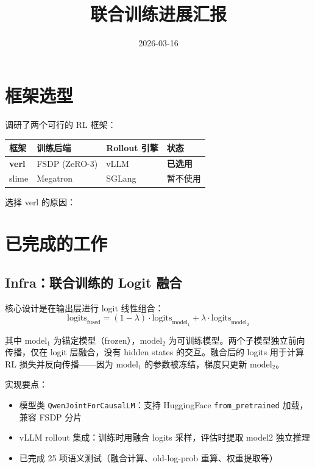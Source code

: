 \documentclass[11pt,a4paper]{article}
\title{联合训练进展汇报}
\author{}
\date{2026-03-16}
\begin{document}
\maketitle

\section{框架选型}

调研了两个可行的 RL 框架：

\begin{table}[h]
\centering
\begin{tabular}{llll}
\toprule
\textbf{框架} & \textbf{训练后端} & \textbf{Rollout 引擎} & \textbf{状态} \\
\midrule
\textbf{verl} & FSDP (ZeRO-3) & vLLM & \textbf{已选用} \\
slime & Megatron & SGLang & 暂不使用 \\
\bottomrule
\end{tabular}
\end{table}

选择 verl 的原因：


\section{已完成的工作}

\subsection{Infra：联合训练的 Logit 融合}

核心设计是在输出层进行 logit 线性组合：
\begin{equation}
\text{logits}_{\text{fused}} = (1 - \lambda) \cdot \text{logits}_{\text{model}_1} + \lambda \cdot \text{logits}_{\text{model}_2}
\end{equation}

其中 $\text{model}_1$ 为锚定模型（frozen），$\text{model}_2$ 为可训练模型。两个子模型独立前向传播，仅在 logit 层融合，没有 hidden states 的交互。融合后的 logits 用于计算 RL 损失并反向传播——因为 $\text{model}_1$ 的参数被冻结，梯度只更新 $\text{model}_2$。

实现要点：
\begin{itemize}[nosep]
    \item 模型类 \texttt{QwenJointForCausalLM}：支持 HuggingFace \texttt{from\_pretrained} 加载，兼容 FSDP 分片
    \item vLLM rollout 集成：训练时用融合 logits 采样，评估时提取 model2 独立推理
    \item 已完成 25 项语义测试（融合计算、old-log-prob 重算、权重提取等）
\end{itemize}
\end{document}
